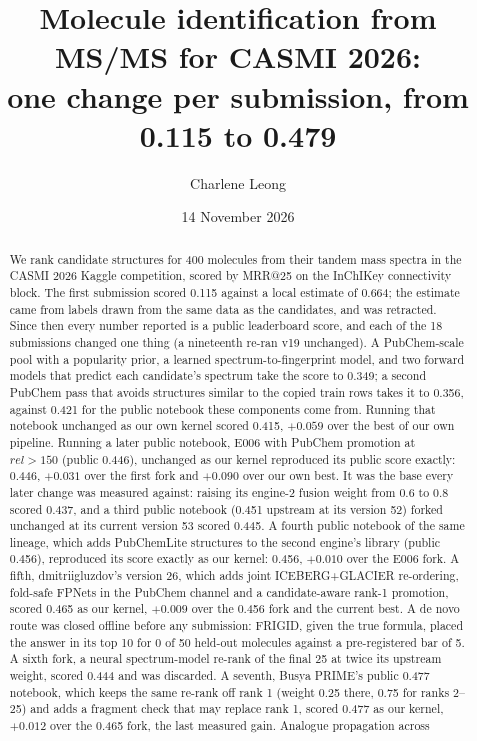 \documentclass[11pt]{article}
\title{Molecule identification from MS/MS for CASMI 2026:\\ one change per submission, from 0.115 to 0.479}
\author{Charlene Leong}
\date{14 November 2026}
\begin{document}
\maketitle

\begin{abstract}
We rank candidate structures for 400 molecules from their tandem mass spectra in the CASMI 2026
Kaggle competition, scored by MRR@25 on the InChIKey connectivity block. The first submission
scored 0.115 against a local estimate of 0.664; the estimate came from labels drawn from the same
data as the candidates, and was retracted. Since then every number reported is a public
leaderboard score, and each of the 18 submissions changed one thing (a nineteenth re-ran v19 unchanged). A PubChem-scale pool with a
popularity prior, a learned spectrum-to-fingerprint model, and two forward models that predict each
candidate's spectrum take the score to 0.349; a second PubChem pass that avoids structures similar
to the copied train rows takes it to 0.356, against 0.421 for the public notebook these
components come from. Running that notebook unchanged as our own kernel scored 0.415, $+0.059$
over the best of our own pipeline. Running a later public notebook, E006 with PubChem promotion at
$\mathit{rel} > 150$ (public 0.446), unchanged as our kernel reproduced its public score exactly:
0.446, $+0.031$ over the first fork and $+0.090$ over our own best. It was the base every later
change was measured against: raising its engine-2 fusion weight from 0.6 to 0.8 scored 0.437, and a
third public notebook (0.451 upstream at its version 52) forked unchanged at its current version 53
scored 0.445. A fourth public notebook of the same lineage, which adds PubChemLite structures to the
second engine's library (public 0.456), reproduced its score exactly as our kernel: 0.456, $+0.010$
over the E006 fork. A fifth, dmitriigluzdov's version 26, which adds joint ICEBERG+GLACIER re-ordering,
fold-safe FPNets in the PubChem channel and a candidate-aware rank-1 promotion, scored 0.465 as our
kernel, $+0.009$ over the 0.456 fork and the current best. A de novo route was closed offline before any submission:
FRIGID, given the true formula, placed the answer in its top 10 for 0 of 50 held-out molecules against
a pre-registered bar of 5. A sixth fork, a neural spectrum-model re-rank of the final 25 at twice its
upstream weight, scored 0.444 and was discarded. A seventh, Busya PRIME's public 0.477 notebook, which keeps
the same re-rank off rank 1 (weight 0.25 there, 0.75 for ranks 2--25) and adds a fragment check that may
replace rank 1, scored 0.477 as our kernel, $+0.012$ over the 0.465 fork, the last measured gain. Analogue propagation across

\end{abstract}
\end{document}
